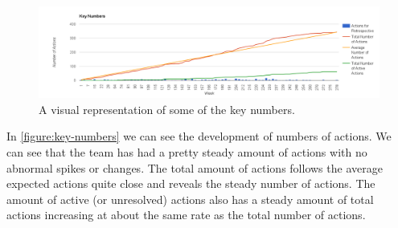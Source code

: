 \begin{figure}
	\centering
	\includegraphics[width=\textwidth]{figures/key-numbers.png}
	\caption{A visual representation of some of the key numbers.}
	\label{figure:key-numbers}
\end{figure}
\afterpage{\clearpage}

In \autoref{figure:key-numbers} we can see the development of numbers of actions. We can see that the team has had a pretty steady amount of actions with no abnormal spikes or changes. The total amount of actions follows the average expected actions quite close and reveals the steady number of actions. The amount of active (or unresolved) actions also has a steady amount of total actions increasing at about the same rate as the total number of actions. 
